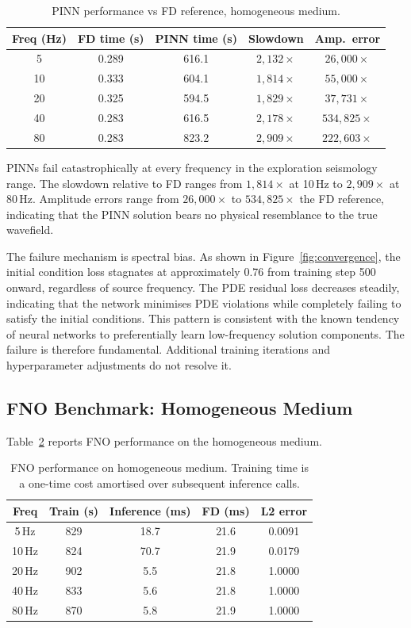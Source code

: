 \documentclass[12pt,a4paper]{article}
\begin{document}
\begin{table}[H]
\centering
\caption{PINN performance vs FD reference, homogeneous medium.}
\label{tab:pinn}
\begin{tabular}{ccccc}
\toprule
Freq (Hz) & FD time (s) & PINN time (s) &
Slowdown & Amp.\ error \\
\midrule
5  & 0.289 & 616.1 & $2{,}132\times$ & $26{,}000\times$ \\
10 & 0.333 & 604.1 & $1{,}814\times$ & $55{,}000\times$ \\
20 & 0.325 & 594.5 & $1{,}829\times$ & $37{,}731\times$ \\
40 & 0.283 & 616.5 & $2{,}178\times$ & $534{,}825\times$ \\
80 & 0.283 & 823.2 & $2{,}909\times$ & $222{,}603\times$ \\
\bottomrule
\end{tabular}
\end{table}

PINNs fail catastrophically at every frequency in the exploration
seismology range. The slowdown relative to FD ranges from
$1{,}814\times$ at 10\,Hz to $2{,}909\times$ at 80\,Hz.
Amplitude errors range from $26{,}000\times$ to $534{,}825\times$
the FD reference, indicating that the PINN solution bears no
physical resemblance to the true wavefield.

The failure mechanism is spectral bias. As shown in
Figure~\ref{fig:convergence}, the initial condition loss
stagnates at approximately 0.76 from training step 500 onward,
regardless of source frequency. The PDE residual loss decreases
steadily, indicating that the network minimises PDE violations
while completely failing to satisfy the initial conditions. This
pattern is consistent with the known tendency of neural networks
to preferentially learn low-frequency solution components. The
failure is therefore fundamental. Additional training iterations
and hyperparameter adjustments do not resolve it.

\subsection{FNO Benchmark: Homogeneous Medium}

Table~\ref{tab:fno} reports FNO performance on the homogeneous
medium.

\begin{table}[H]
\centering
\caption{FNO performance on homogeneous medium. Training time
is a one-time cost amortised over subsequent inference calls.}
\label{tab:fno}
\begin{tabular}{ccccc}
\toprule
Freq & Train (s) & Inference (ms) & FD (ms) & L2 error \\
\midrule
5\,Hz  & 829 & 18.7 & 21.6 & 0.0091 \\
10\,Hz & 824 & 70.7 & 21.9 & 0.0179 \\
20\,Hz & 902 & 5.5  & 21.8 & 1.0000 \\
40\,Hz & 833 & 5.6  & 21.8 & 1.0000 \\
80\,Hz & 870 & 5.8  & 21.9 & 1.0000 \\
\bottomrule
\end{tabular}
\end{table}
\end{document}
